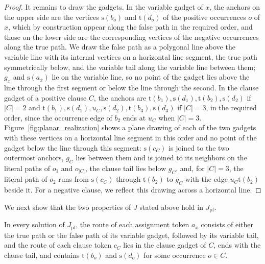 \documentclass[a4paper,USenglish,thm-restate]{lipics-v2021}
\newcommand{\src}{\mathrm{s}}
\newcommand{\tgt}{\mathrm{t}}
\theoremstyle{problemstyle}
\begin{document}
\begin{proof}
It remains to draw the gadgets. In the variable gadget of $x$, the anchors
on the upper side are the vertices $\src(b_o)$ and $\tgt(d_o)$ of the
positive occurrences $o$ of $x$, which by construction appear along the
false path in the required order, and those on the lower side are the
corresponding vertices of the negative occurrences along the true path.
We draw the false path as a polygonal line above the variable line with
its internal vertices on a horizontal line segment, the true path
symmetrically below, and the variable tail along the variable line between
them; $g_x$ and $\src(a_x)$ lie on the variable line, so no point of the
gadget lies above the line through the first segment or below the line
through the second. In the
clause gadget of a positive clause $C$, the anchors are
$\tgt(b_1),\src(d_1),\tgt(b_2),\src(d_2)$ if $|C|=2$ and
$\tgt(b_1),\src(d_1),u_C,\src(d_2),\tgt(b_3),\src(d_3)$ if $|C|=3$, in
the required order, since the occurrence edge of $b_2$ ends at $u_C$ when
$|C|=3$. Figure~\ref{fig:planar_realization} shows a plane drawing of each
of the two gadgets with these vertices on a horizontal line segment in
this order and no point of the gadget below the line through this segment: $\src(c_C)$ is joined to
the two outermost anchors, $g_C$ lies between them and is joined to its
neighbors on the literal paths of $o_1$ and $o_{|C|}$, the clause tail
lies below $g_C$, and, for $|C|=3$, the literal path of $o_2$ runs from
$\src(c_C)$ through $\tgt(b_2)$ to $g_C$ with the edge $u_C\tgt(b_2)$
beside it. For a negative clause, we reflect this drawing across a
horizontal line.
\end{proof}

We next show that the two properties of $J$ stated above hold in
$J_{\mathrm{pl}}$.

\begin{lemma}\label{lem:planar-routes}
In every solution of $J_{\mathrm{pl}}$, the route of each assignment token
$a_x$ consists of either the true path or the false path of its variable
gadget, followed by its variable tail, and the route of each clause token
$c_C$ lies in the clause gadget of $C$, ends with the clause tail, and
contains $\tgt(b_o)$ and $\src(d_o)$ for some occurrence $o\in C$.
\end{lemma}
\end{document}
